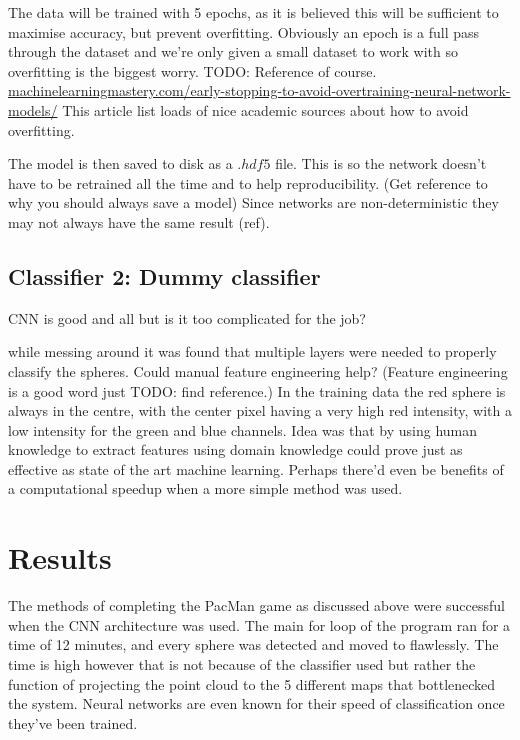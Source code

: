 \documentclass{article}
\begin{document}
The data will be trained with 5 epochs, as it is believed this will be sufficient to maximise accuracy, but prevent overfitting.
Obviously an epoch is a full pass through the dataset and we're only given a small dataset to work with so overfitting is the biggest worry.
TODO: Reference of course.
\url{machinelearningmastery.com/early-stopping-to-avoid-overtraining-neural-network-models/}
This article list loads of nice academic sources about how to avoid overfitting.

The model is then saved to disk as a $.hdf5$ file.
This is so the network doesn't have to be retrained all the time and to help reproducibility.
(Get reference to why you should always save a model)
Since networks are non-deterministic they may not always have the same result (ref).

\subsection{Classifier 2: Dummy classifier}
CNN is good and all but is it too complicated for the job?

while messing around it was found that multiple layers were needed to properly classify the spheres.
Could manual feature engineering help? (Feature engineering is a good word just TODO: find reference.)
In the training data the red sphere is always in the centre, with the center pixel having a very high red intensity, with a low intensity for the green and blue channels. 
Idea was that by using human knowledge to extract features using domain knowledge could prove just as effective as state of the art machine learning.
Perhaps there'd even be benefits of a computational speedup when a more simple method was used.


\section{Results}

The methods of completing the PacMan game as discussed above were successful when the CNN architecture was used.
The main for loop of the program ran for a time of 12 minutes, and every sphere was detected and moved to flawlessly.
The time is high however that is not because of the classifier used but rather the function of projecting the point cloud to the 5 different maps that bottlenecked the system.
Neural networks are even known for their speed of classification once they've been trained.
\end{document}
